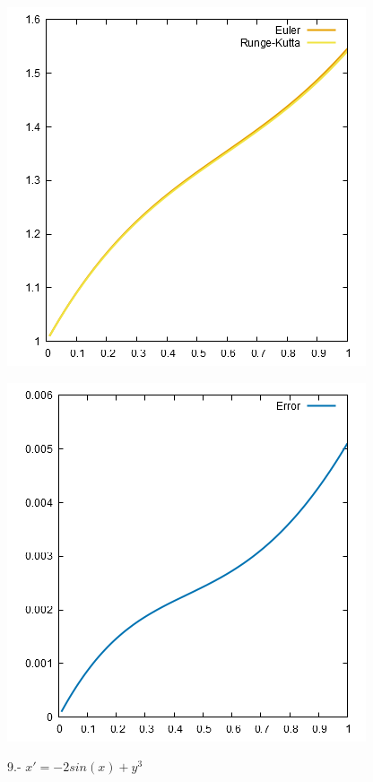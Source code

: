 \documentclass[10pt]{article}
\begin{document}
\begin{multicols}{2}
\begin{center}
				\includegraphics[scale=0.4]{../Graficas/8.png}
			\end{center}
			\begin{center}
				\includegraphics[scale=0.4]{../Graficas/8_1.png}
			\end{center}
			9.- $x'=-2sin(x)+y^3$
			\begin{center}

\end{center}
\end{multicols}
\end{document}
